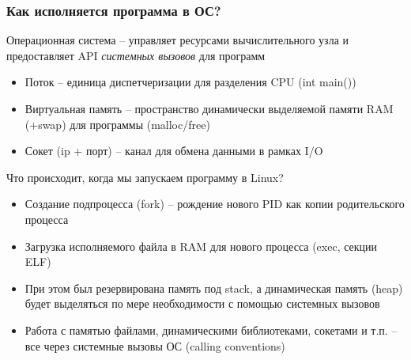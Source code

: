 \documentclass{beamer}
\begin{document}
\begin{frame}
\frametitle{Как исполняется программа в ОС?}

\begin{itemize}
	\item Операционная система – управляет ресурсами вычислительного узла и предоставляет API {\itshape системных вызовов} для программ
	\begin{itemize}
        \item Поток – единица диспетчеризации для разделения CPU (int main())
        \item Виртуальная память – пространство динамически выделяемой памяти RAM (+swap) для программы (malloc/free)
        \item Сокет (ip + порт) – канал для обмена данными в рамках I/O
    \end{itemize}
    {\pause
    \item Что происходит, когда мы запускаем программу в Linux?
	\begin{itemize}
        \item Создание подпроцесса (fork) – рождение нового PID как копии родительского процесса
        \item Загрузка исполняемого файла в RAM для нового процесса (exec, секции ELF)
        \item При этом был резервирована память под stack, а динамическая память (heap) будет выделяться по мере необходимости с помощью системных вызовов
        \item Работа с памятью файлами, динамическими библиотеками, сокетами и т.п. – все через системные вызовы ОС (calling conventions)
    \end{itemize}
    }
\end{itemize}

\end{frame}
\end{document}
